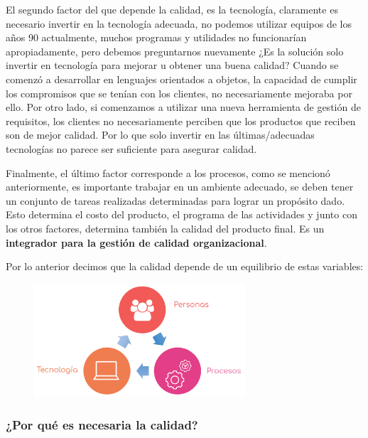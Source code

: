             El segundo factor del que depende la calidad, es la tecnología, claramente es necesario invertir en la tecnología adecuada, no podemos utilizar equipos de los años 90 actualmente, muchos programas y utilidades no funcionarían apropiadamente, pero debemos preguntarnos nuevamente ¿Es la solución solo invertir en tecnología para mejorar u obtener una buena calidad?
            Cuando se comenzó a desarrollar en lenguajes orientados a objetos, la capacidad de cumplir los compromisos que se tenían con los clientes, no necesariamente mejoraba por ello. Por otro lado, si comenzamos a utilizar una nueva herramienta de gestión de requisitos, los clientes no necesariamente perciben que los productos que reciben son de mejor calidad. Por lo que solo invertir en las últimas/adecuadas tecnologías no parece ser suficiente para asegurar calidad.
            
            Finalmente, el último factor corresponde a los procesos, como se mencionó anteriormente, es importante trabajar en un ambiente adecuado, se deben tener un conjunto de tareas realizadas determinadas para lograr un propósito dado. Esto determina el costo del producto, el programa de las actividades y junto con los otros factores, determina también la calidad del producto final. Es un \textbf{integrador para la gestión de calidad organizacional}.
            
            Por lo anterior decimos que la calidad depende de un equilibrio de estas variables:
            \begin{figure}[h]
                \centering
                \includegraphics[width=0.7\textwidth]{imgs/1.png}
            \end{figure}
            
            \newpage
            
            \subsubsection*{¿Por qué es necesaria la calidad?}
            
